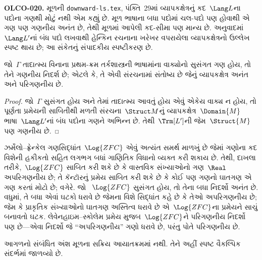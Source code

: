 \begin{editorial}
\textbf{OLCO-020.} મૂળની \texttt{downward-ls.tex}, પંક્તિ~29માં વ્યાપકક્ષેત્રનું કદ~$\Lang L$ના પદોના ગણથી મોટું નથી એમ કહ્યું છે. મૂળ ભાષાના બધા પદોમાં ચલ-પદો પણ હોવાથી એ ગણ પણ ગણનીય અનંત છે, તેથી મૂળમાં આપેલી કદ-સીમા પણ માન્ય છે. અનુવાદમાં~$\Lang L'$નાં બંધ પદો લખવાથી હેન્કિન રચનાના ખરેખર વપરાયેલા વ્યાપકક્ષેત્રનો ઉલ્લેખ સ્પષ્ટ થાય છે; આ સંકેતનું સંપાદકીય સ્પષ્ટીકરણ છે.
\end{editorial}

\begin{thm}
 જો~$\Gamma$ તાદાત્મ્ય વિનાના પ્રથમ-ક્રમ
તર્કશાસ્ત્રની ભાષામાંના વાક્યોનો સુસંગત ગણ હોય, તો તેને
ગણનીય નિદર્શ છે; એટલે કે, તે એવી સંરચનામાં સંતોષ્ય
છે જેનું વ્યાપકક્ષેત્ર અનંત અને પરિગણનીય છે.
\end{thm}

\begin{proof}
જો~$\Gamma$ સુસંગત હોય અને તેમાં તાદાત્મ્ય આવતું હોય એવું એકેય વાક્ય
ન હોય, તો પૂર્ણતા પ્રમેયની સાબિતીથી મળતી સંરચના~$\Struct M$નું
વ્યાપકક્ષેત્ર~$\Domain{M}$ ભાષા~$\Lang L'$નાં બંધ પદોના ગણને અભિન્ન છે.
તેથી~$\Trm[L']$ની જેમ~$\Struct{M}$ પણ ગણનીય છે.
\end{proof}

\begin{ex}[સ્કોલેમનો વિરોધાભાસ]
ઝર્મેલો--ફ્રેન્કેલ ગણસિદ્ધાંત~$\Log{ZFC}$ એવું અત્યંત સમર્થ માળખું છે
જેમાં ગણોના કદ વિશેની હકીકતો સહિત લગભગ બધાં ગાણિતિક વિધાનો વ્યક્ત કરી
શકાય છે. તેથી, દાખલા તરીકે,~$\Log{ZFC}$ સાબિત કરી શકે છે કે વાસ્તવિક
સંખ્યાઓનો ગણ~$\Real$ અપરિગણનીય છે; તે કૅન્ટૉરનું પ્રમેય સાબિત
કરી શકે છે કે કોઈ પણ ગણનો ઘાતગણ એ ગણ કરતાં મોટો છે; વગેરે. જો
~$\Log{ZFC}$ સુસંગત હોય, તો તેના બધા નિદર્શો અનંત છે. વધુમાં, તે બધા
એવાં ઘટકો ધરાવે છે જેમના વિશે સિદ્ધાંત કહે છે કે તેઓ
અપરિગણનીય છે; જેમ કે પ્રાકૃતિક સંખ્યાઓનો ઘાતગણ અસ્તિત્વ ધરાવે
છે એ~$\Log{ZFC}$ના પ્રમેયને સાચું બનાવતો ઘટક. લેવેનહાઇમ--સ્કોલેમ
પ્રમેય મુજબ~$\Log{ZFC}$ને પરિગણનીય નિદર્શો પણ છે—એવા નિદર્શો જે
``અપરિગણનીય'' ગણો ધરાવે છે, પરંતુ પોતે પરિગણનીય છે.
\end{ex}
\endgroup


\OLEndChapterHook


\begin{editorial}
આગળનો સંબંધિત અંશ મૂળના સક્રિય આયાતક્રમમાં નથી. તેને અહીં સ્પષ્ટ વૈકલ્પિક સંદર્ભમાં જાળવ્યો છે.
\end{editorial}
\begingroup
\makeatletter{}\makeatother

\label{guunit:OLP-0644}



